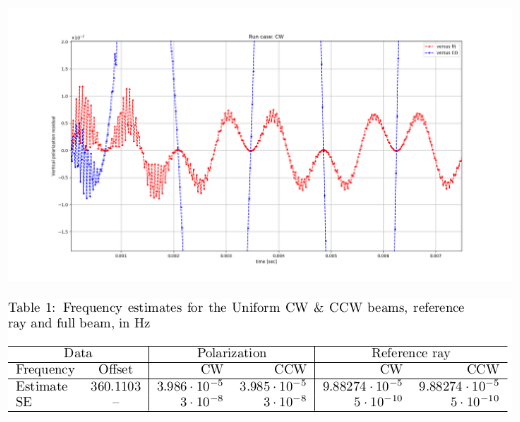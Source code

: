\documentclass{beamer}
\begin{document}
\begin{frame}
  \begin{center}
    \includegraphics[height=.5\paperheight]{img/spin_axis_motion/CW_polarization_residual_cut}
  \end{center}
  \begin{center}
    \includegraphics[height=.25\paperheight]{img/spin_axis_motion/presentation/uni_beam_table}
  \end{center}
\end{frame}
\end{document}
